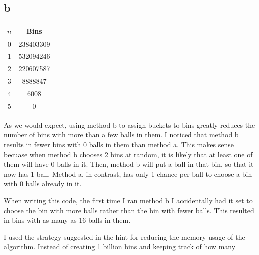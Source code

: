 \documentclass{article}
\begin{document}
\subsection*{b}
\begin{center}
\begin{tabular} { | c | c | }
\hline
$n$ & Bins\\

\hline\hline
0 & 238403309\\
\hline
1 &  532094246\\
\hline
2 & 220607587\\
\hline 
3 &  8888847\\
\hline
4 & 6008 \\
\hline
5 & 0 \\
\hline

\end{tabular}
\end{center}

As we would expect, using method b to assign buckets to bins greatly reduces the number of bins with more than a few balls in them. I  noticed that method b results in fewer bins with 0 balls in them than method a. This makes sense becuase when method b chooses 2 bins at random, it is likely that at least one of them will have 0 balls in it. Then, method b will put a ball in that bin, so that it now has 1 ball. Method a, in contrast, has only 1 chance per ball to choose a bin with 0 balls already in it. 

When writing this code, the first time I ran method b I accidentally had it set to choose the bin with more balls rather than the bin with fewer balls. This resulted in bins with as many as 16 balls in them. 

I used the strategy suggested in the hint for reducing the memory usage of the algorithm. Instead of creating 1 billion bins and keeping track of how many 
\end{document}
